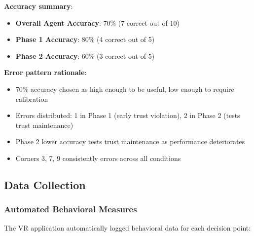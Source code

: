 \documentclass[12pt]{article}
\begin{document}
\textbf{Accuracy summary}:
\begin{itemize}
    \item \textbf{Overall Agent Accuracy}: 70\% (7 correct out of 10)
    \item \textbf{Phase 1 Accuracy}: 80\% (4 correct out of 5)
    \item \textbf{Phase 2 Accuracy}: 60\% (3 correct out of 5)
\end{itemize}

\textbf{Error pattern rationale}:
\begin{itemize}
    \item 70\% accuracy chosen as high enough to be useful, low enough to require calibration
    \item Errors distributed: 1 in Phase 1 (early trust violation), 2 in Phase 2 (tests trust maintenance)
    \item Phase 2 lower accuracy tests trust maintenance as performance deteriorates
    \item Corners 3, 7, 9 consistently errors across all conditions
\end{itemize}

\subsection{Data Collection}

\subsubsection{Automated Behavioral Measures}

The VR application automatically logged behavioral data for each decision point:
\end{document}
